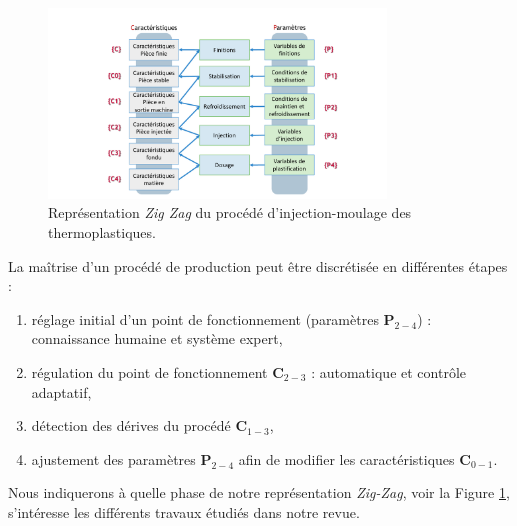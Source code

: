 \begin{figure}[hbtp]
	\centering
	\includegraphics[width=0.80\textwidth,height=\textheight,keepaspectratio]{../Chap1/Figures/Sapristi_ZigZag.pdf}
	\caption{Représentation \textit{Zig Zag} du procédé d'injection-moulage des thermoplastiques.}
	\label{fig:annexe_zigzag}
\end{figure}

La maîtrise d'un procédé de production peut être discrétisée en différentes étapes :
\begin{enumerate}
	\item réglage initial d'un point de fonctionnement (paramètres $\boldsymbol{P}_{2-4}$) : connaissance humaine et système expert,
	\item régulation du point de fonctionnement $\boldsymbol{C}_{2-3}$ : automatique et contrôle adaptatif,
	\item détection des dérives du procédé $\boldsymbol{C}_{1-3}$,
	\item ajustement des paramètres $\boldsymbol{P}_{2-4}$ afin de modifier les caractéristiques $\boldsymbol{C}_{0-1}$.
\end{enumerate}
\noindent
Nous indiquerons à quelle phase de notre représentation \textit{Zig-Zag}, voir la Figure \ref{fig:annexe_zigzag}, s'intéresse les différents travaux étudiés dans notre revue.

